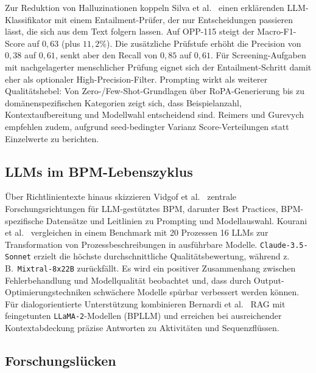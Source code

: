 Zur Reduktion von Halluzinationen koppeln Silva et al.\ \cite{silva2024entailment} einen erklärenden \ac{LLM}-Klassifikator mit einem Entailment-Prüfer, der nur Entscheidungen passieren lässt, die sich aus dem Text folgern lassen. Auf OPP-115 steigt der Macro-F1-Score auf $0{,}63$ (plus $11{,}2$\%). Die zusätzliche Prüfstufe erhöht die Precision von $0{,}38$ auf $0{,}61$, senkt aber den Recall von $0{,}85$ auf $0{,}61$. Für Screening-Aufgaben mit nachgelagerter menschlicher Prüfung eignet sich der Entailment-Schritt damit eher als optionaler High-Precision-Filter. Prompting wirkt als weiterer Qualitätshebel: Von Zero-/Few-Shot-Grundlagen \cite{brown2020fewshot,liu2023prompting} über RoPA-Generierung \cite{pragyan2024toward} bis zu domänenspezifischen Kategorien \cite{schwerin2024systematic} zeigt sich, dass Beispielanzahl, Kontextaufbereitung und Modellwahl entscheidend sind. Reimers und Gurevych \cite{reimers2017reporting} empfehlen zudem, aufgrund seed-bedingter Varianz Score-Verteilungen statt Einzelwerte zu berichten.

\subsection*{\acp{LLM} im BPM-Lebenszyklus}

Über Richtlinientexte hinaus skizzieren Vidgof et al.\ \cite{vidgof2023largelanguagemodelsbusiness} zentrale Forschungsrichtungen für \ac{LLM}-gestütztes \ac{BPM}, darunter Best Practices, \ac{BPM}-spezifische Datensätze und Leitlinien zu Prompting und Modellauswahl. Kourani et al.\ \cite{kourani2025evaluating} vergleichen in einem Benchmark mit 20 Prozessen 16 \acp{LLM} zur Transformation von Prozessbeschreibungen in ausführbare Modelle. \texttt{Claude-3.5-Sonnet} erzielt die höchste durchschnittliche Qualitätsbewertung, während z.\,B.\ \texttt{Mixtral-8x22B} zurückfällt. Es wird ein positiver Zusammenhang zwischen Fehlerbehandlung und Modellqualität beobachtet und, dass durch Output-Optimierungstechniken schwächere Modelle spürbar verbessert werden können. Für dialogorientierte Unterstützung kombinieren Bernardi et al.\ \cite{bernardi2024conversing} \ac{RAG} mit feingetunten \texttt{LLaMA-2}-Modellen (BPLLM) und erreichen bei ausreichender Kontextabdeckung präzise Antworten zu Aktivitäten und Sequenzflüssen.

\subsection*{Forschungslücken}


